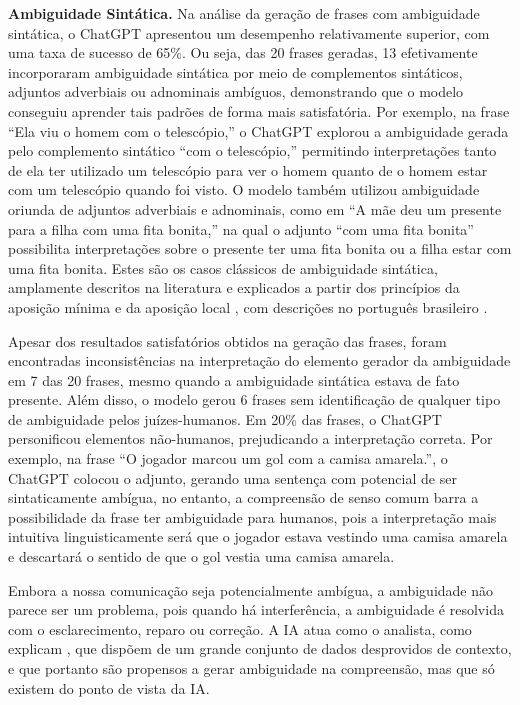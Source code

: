 \textbf{Ambiguidade Sintática.}
Na análise da geração de frases com ambiguidade sintática, o ChatGPT apresentou um desempenho relativamente superior, com uma taxa de sucesso de 65\%. Ou seja, das 20 frases geradas, 13 efetivamente incorporaram ambiguidade sintática por meio de complementos sintáticos, adjuntos adverbiais ou adnominais ambíguos, demonstrando que o modelo conseguiu aprender tais padrões de forma mais satisfatória. Por exemplo, na frase \enquote{Ela viu o homem com o telescópio,} o ChatGPT explorou a ambiguidade gerada pelo complemento sintático \enquote{com o telescópio,} permitindo interpretações tanto de ela ter utilizado um telescópio para ver o homem quanto de o homem estar com um telescópio quando foi visto. O modelo também utilizou ambiguidade oriunda de adjuntos adverbiais e adnominais, como em \enquote{A mãe deu um presente para a filha com uma fita bonita,} na qual o adjunto \enquote{com uma fita bonita} possibilita interpretações sobre o presente ter uma fita bonita ou a filha estar com uma fita bonita. Estes são os casos clássicos de ambiguidade sintática, amplamente descritos na literatura e explicados a partir dos princípios da aposição mínima e da aposição local \cite{maiadimensoes}, com descrições no português brasileiro \cite{maia2003processamento, maia2004compreensao, brito2013processamento}.

Apesar dos resultados satisfatórios obtidos na geração das frases, foram encontradas inconsistências na interpretação do elemento gerador da ambiguidade em 7 das 20 frases, mesmo quando a ambiguidade sintática estava de fato presente. Além disso, o modelo gerou 6 frases sem identificação de qualquer tipo de ambiguidade pelos juízes-humanos. Em 20\% das frases, o ChatGPT personificou elementos não-humanos, prejudicando a interpretação correta. Por exemplo, na frase \enquote{O jogador marcou um gol com a camisa amarela.}, o ChatGPT colocou o adjunto, gerando uma sentença com potencial de ser sintaticamente ambígua, no entanto, a compreensão de senso comum barra a possibilidade da frase ter ambiguidade para humanos, pois a interpretação mais intuitiva linguisticamente será que o jogador estava vestindo uma camisa amarela e descartará o sentido de que o gol vestia uma camisa amarela.

Embora a nossa comunicação seja potencialmente ambígua, a ambiguidade não parece ser um problema, pois quando há interferência, a ambiguidade é resolvida com o esclarecimento, reparo ou correção. A IA atua como o analista, como explicam \cite{freitag2021gramatica}, que dispõem de um grande conjunto de dados desprovidos de contexto, e que portanto são propensos a gerar ambiguidade na compreensão, mas que só existem do ponto de vista da IA.

